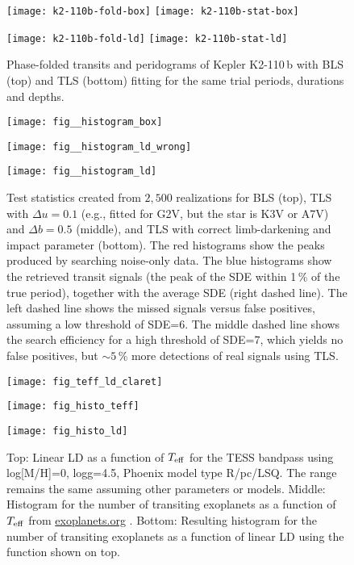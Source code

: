 \documentclass[twocolumn,tighten,longauthor]{myaastex62}
\begin{document}
\clearpage

\begin{figure*}
\texttt{[image: k2-110b-fold-box]}
\texttt{[image: k2-110b-stat-box]}

\texttt{[image: k2-110b-fold-ld]}
\texttt{[image: k2-110b-stat-ld]}
\caption{\label{fig:perios}Phase-folded transits and peridograms of Kepler K2-110\,b with BLS (top) and TLS (bottom) fitting for the same trial periods, durations and depths.}
\end{figure*}

\clearpage

\begin{figure}
\texttt{[image: fig\_\_histogram\_box]}

\texttt{[image: fig\_\_histogram\_ld\_wrong]}

\texttt{[image: fig\_\_histogram\_ld]}
\caption{\label{fig:histos_noise}Test statistics created from $2{,}500$ realizations for BLS (top), TLS with $\Delta u=0.1$ (e.g., fitted for G2V, but the star is K3V or A7V) and $\Delta b=0.5$ (middle), and TLS with correct limb-darkening and impact parameter (bottom). The red histograms show the peaks produced by  searching noise-only data. The blue histograms show the retrieved transit signals (the peak of the SDE within 1\,\% of the true period), together with the average SDE (right dashed line). The left dashed line shows the missed signals versus false positives, assuming a low threshold of SDE=6. The middle dashed line shows the search efficiency for a high threshold of SDE=7, which yields no false positives, but $\sim5\,$\% more detections of real signals using TLS.}
\end{figure}

\clearpage

\begin{figure}
\texttt{[image: fig\_teff\_ld\_claret]}

\texttt{[image: fig\_histo\_teff]}

\texttt{[image: fig\_histo\_ld]}
\caption{\label{fig:ld}Top: Linear LD as a function of $T_{\rm eff}$ for the TESS bandpass \citep{2017A&A...600A..30C} using log[M/H]=0, logg=4.5, Phoenix model type R/pc/LSQ. The range remains the same assuming other parameters or models. Middle: Histogram for the number of transiting exoplanets as a function of $T_{\rm eff}$ from \url{exoplanets.org} \citep{2014PASP..126..827H}. Bottom: Resulting histogram for the number of transiting exoplanets as a function of linear LD using the function shown on top.}
\end{figure}
\end{document}

